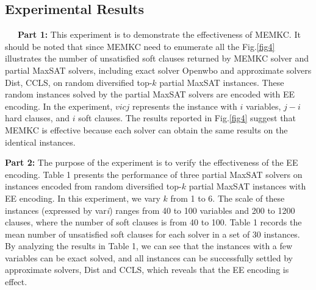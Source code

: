 \documentclass{llncs}
\begin{document}
\subsection{Experimental Results}

~~~{\bfseries Part 1:} This experiment is to demonstrate the effectiveness of MEMKC. It should be noted that since MEMKC need to enumerate all the Fig.\ref{fig4} illustrates the number of unsatisfied soft clauses returned by MEMKC solver and partial MaxSAT solvers, including exact solver Openwbo and approximate solvers Dist, CCLS, on random diversified top-$k$ partial MaxSAT instances. These random instances solved by the partial MaxSAT solvers are encoded with EE encoding. In the experiment, $vicj$ represents the instance with $i$ variables, $j-i$ hard clauses, and $i$ soft clauses. The results reported in Fig.\ref{fig4} suggest that MEMKC is effective because each solver can obtain the same results on the identical instances.



{\bfseries Part 2:} The purpose of the experiment is to verify the effectiveness of the EE encoding. Table 1 presents the performance of three partial MaxSAT solvers on instances encoded from random diversified top-$k$ partial MaxSAT instances with EE encoding. In this experiment, we vary $k$ from 1 to 6. The scale of these instances (expressed by var\textit {i}) ranges from 40 to 100 variables and 200 to 1200 clauses, where the number of soft clauses is from 40 to 100. Table 1 records the mean number of unsatisfied soft clauses for each solver in a set of 30 instances. By analyzing the results in Table 1, we can see that the instances with a few variables can be exact solved, and all instances can be successfully settled by approximate solvers, Dist and CCLS, which reveals that the EE encoding is effect.
\end{document}
